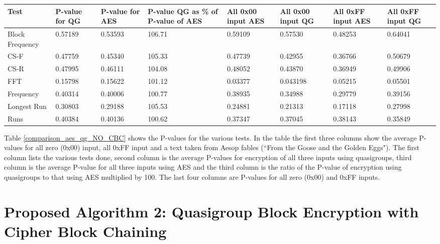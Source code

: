 \documentclass[conference]{IEEEtran}
\begin{document}
\begin{table*}
\centering
\begin{tabular}{|p{2cm}|p{1.5cm}|p{1.5cm}|p{2.25cm}||p{1.5cm}|p{1.5cm}|p{1.5cm}|p{1.5cm}|}
\hline
Test & P-value for QG&  P-value for AES&  P-value QG as \% of P-value of AES& All 0x00 input AES& All 0x00 input QG& All 0xFF input AES& All 0xFF input QG\\ \hline
Block Frequency& 0.57189& 0.53593&  106.71& 0.59109& 0.57530& 0.48253& 0.64041\\ \hline
CS-F& 0.47759& 0.45340&  105.33& 0.47739& 0.42955& 0.36766& 0.50679\\ \hline
CS-R& 0.47995& 0.46111&  104.08& 0.48052& 0.43870& 0.36949& 0.49906\\ \hline
FFT& 0.15798& 0.15622&  101.12& 0.03377& 0.043198& 0.05215& 0.05501\\ \hline
Frequency& 0.40314& 0.40006&  100.77& 0.38935& 0.34988& 0.29779& 0.39156\\ \hline
Longest Run& 0.30803& 0.29188&  105.53& 0.24881& 0.21313& 0.17118& 0.27998\\ \hline
Runs& 0.40384& 0.40136& 100.62& 0.37347& 0.37045& 0.38143& 0.35849\\ \hline
\end{tabular}
\caption{The table shows average P-values (over 20 runs) for quasigroup encryption as compared to AES256 encryption system when the same encryption key is used for both cryptosystems without Cipher-Block-Chaining (CBC).}
\vspace{-0.20in}
\label{comparison_aes_qg_NO_CBC}
\end{table*}

Table \ref{comparison_aes_qg_NO_CBC} shows the P-values for the various tests. In the table the first three columns show the average P-values for all zero (0x00) input, all 0xFF input and a text taken from Aesop fables (``From the Goose and the Golden Eggs"). The first column lists the various tests done, second column is the average P-values for encryption of all three inputs using quasigroups, third column is the average P-value for all three inputs using AES and the third column is the ratio of the P-value of encryption using quasigroups to that using AES multiplied by 100. The last four columns are P-values for all zero (0x00) and 0xFF inputs.

\section{Proposed Algorithm 2: Quasigroup Block Encryption with Cipher Block Chaining}
\end{document}
